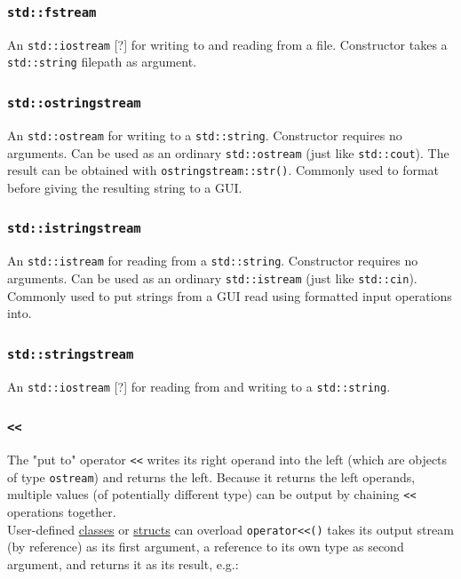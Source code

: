 \documentclass[table, xcdraw]{article}%
\begin{document}
\subsubsection{\texttt{std::fstream}}

An \texttt{std::iostream} [?] for writing to and reading from a file. Constructor takes a \texttt{std::string} filepath as argument.

\subsubsection{\texttt{std::ostringstream}}

An \texttt{std::ostream} for writing to a \texttt{std::string}. Constructor requires no arguments. Can be used as an ordinary \texttt{std::ostream} (just like \texttt{std::cout}). The result can be obtained with \texttt{ostringstream::str()}. Commonly used to format before giving the resulting string to a GUI.

\subsubsection{\texttt{std::istringstream}}

An \texttt{std::istream} for reading from a \texttt{std::string}. Constructor requires no arguments. Can be used as an ordinary \texttt{std::istream} (just like \texttt{std::cin}). Commonly used to put strings from a GUI read using formatted input operations into.

\subsubsection{\texttt{std::stringstream}}

An \texttt{std::iostream} [?] for reading from and writing to a \texttt{std::string}.

\subsubsection{\texttt{<<}}
The "put to" operator \texttt{<<} writes its right operand into the left (which are objects of type \texttt{ostream}) and returns the left. Because it returns the left operands, multiple values (of potentially different type) can be output by chaining \texttt{<<} operations together.\\
User-defined \hyperref[class]{classes} or \hyperref[struct]{structs} can overload \texttt{operator<<()} takes its output stream (by reference) as its first argument, a reference to its own type as second argument, and returns it as its result, e.g.:
\end{document}
